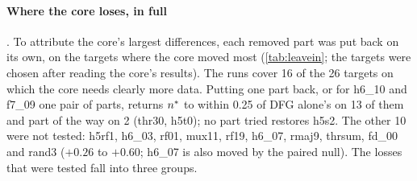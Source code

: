\paragraph{Where the core loses, in full} . To attribute the core's largest differences, each removed part was put back on its own, on the targets where the core moved most (\cref{tab:leavein}; the targets were chosen after reading the core's results). The runs cover 16 of the 26 targets on which the core needs clearly more data. Putting one part back, or for h6\_10 and f7\_09 one pair of parts, returns $n^{*}$ to within 0.25 of DFG alone's on 13 of them and part of the way on 2 (thr30, h5t0); no part tried restores h5s2. The other 10 were not tested: h5rf1, h6\_03, rf01, mux11, rf19, h6\_07, rmaj9, thrsum, fd\_00 and rand3 ($+0.26$ to $+0.60$; h6\_07 is also moved by the paired null). The losses that were tested fall into three groups.
